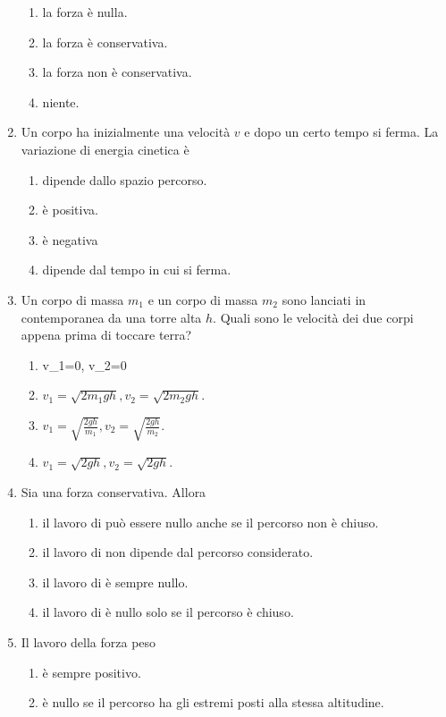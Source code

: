 \documentclass{article}
\begin{document}
\begin{enumerate}
  \begin{enumerate}[label=\Alph*.]
    \item la forza è nulla.
    \item la forza è conservativa.
    \item la forza non è conservativa.
    \item niente.
  \end{enumerate}
  \item Un corpo ha inizialmente una velocità $v$ e dopo un certo tempo si ferma. La variazione di energia cinetica è
  \begin{enumerate}[label=\Alph*.]
    \item dipende dallo spazio percorso.
    \item è positiva.
    \item è negativa
    \item dipende dal tempo in cui si ferma.
  \end{enumerate}
  \item Un corpo di massa $m_1$ e un corpo di massa $m_2$ sono lanciati in contemporanea da una torre alta $h$. Quali sono le velocità dei due corpi appena prima di toccare terra?
  \begin{enumerate}[label=\Alph*.]
    \item v_1=0, v_2=0
    \item $v_1=\sqrt{2m_1gh}, v_2=\sqrt{2m_2gh}$.
    \item $v_1=\sqrt{\frac{2gh}{m_1}}, v_2=\sqrt{\frac{2gh}{m_2}}$.
    \item $v_1=\sqrt{2gh}, v_2=\sqrt{2gh}$.
  \end{enumerate}
  \item Sia  una forza conservativa. Allora
  \begin{enumerate}[label=\Alph*.]
    \item il lavoro di  può essere nullo anche se il percorso non è chiuso.
    \item il lavoro di  non dipende dal percorso considerato.
    \item il lavoro di  è sempre nullo.
    \item il lavoro di  è nullo solo se il percorso è chiuso.
  \end{enumerate}
  \item Il lavoro della forza peso
  \begin{enumerate}[label=\Alph*.]
    \item è sempre positivo.
    \item è nullo se il percorso ha gli estremi posti alla stessa altitudine.

\end{enumerate}
\end{enumerate}
\end{document}
